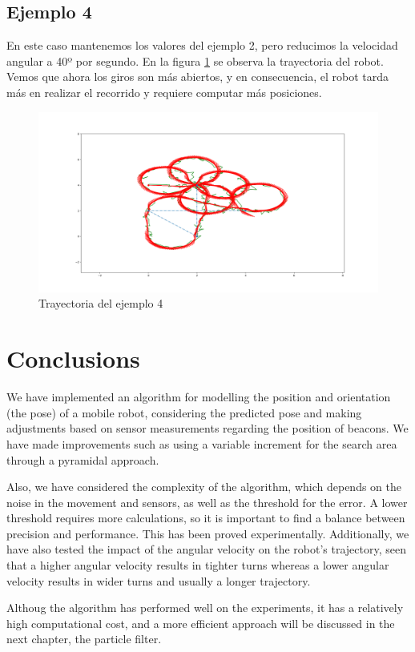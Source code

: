 \subsection{Ejemplo 4}
En este caso mantenemos los valores del ejemplo 2, pero reducimos la velocidad angular a 40º por segundo. 
En la figura \ref{fig:localizacion_ej6} se observa la trayectoria del robot. Vemos que ahora los giros son más abiertos, y en consecuencia, el robot tarda más
en realizar el recorrido y requiere computar más posiciones.

\begin{figure}[htb]
  \centering
  \includegraphics[width=1\linewidth]{images/localizacion12.png}
  \caption{Trayectoria del ejemplo 4}
  \label{fig:localizacion_ej6}
\end{figure}

\section{Conclusions}
We have implemented an algorithm for modelling the position and orientation (the pose) of a mobile robot, considering the predicted pose and making adjustments based on sensor measurements regarding the position of beacons.
We have made improvements such as using a variable increment for the search area through a pyramidal approach.

\bigskip Also, we have considered the complexity of the algorithm, which depends on the noise in the movement and sensors, as well as the threshold for the error. A lower threshold requires more calculations, so it is important to find a balance between precision and performance.
This has been proved experimentally. Additionally, we have also tested the impact of the angular velocity on the robot's trajectory, seen that a higher angular velocity results in tighter turns whereas a lower angular velocity results in wider turns and usually a longer trajectory.

\bigskip Althoug the algorithm has performed well on the experiments, it has a relatively high computational cost, and a more efficient approach will be discussed in the next chapter, the particle filter.
